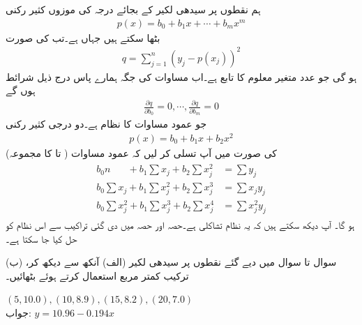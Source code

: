 ہم نقطوں پر سیدھی لکیر  کے بجائے درجہ  کی موزوں کثیر رکنی
\begin{align*}
p(x)=b_0+b_1x+\cdots+b_mx^m
\end{align*}
بٹھا سکتے ہیں جہاں  ہے۔تب  کی صورت 
\begin{align*}
q=\sum_{j=1}^{n}(y_j-p(x_j))^2
\end{align*}
ہو گی جو  عدد متغیر معلوم  کا تابع ہے۔اب مساوات  کی  جگہ ہمارے پاس درج ذیل  شرائط ہوں گے
\begin{align*}
\frac{\partial q}{\partial b_0}=0,\cdots,\frac{\partial q}{\partial b_m}=0
\end{align*}
جو   عمود مساوات کا نظام ہے۔دو درجی کثیر رکنی
\begin{align}\label{مساوات_خطی_اعدادی_کمتر_مربع_شرائط_ت}
p(x)=b_0+b_1x+b_2x^2
\end{align}
 کی صورت میں آپ تسلی کر لیں کہ عمود مساوات ( تا  کا مجموعہ)
\begin{gather}
\begin{aligned}\label{مساوات_خطی_اعدادی_کمتر_مربع_شرائط_ٹ}
b_0 n\phantom{\sum {}_j}+b_1\sum x_j+b_2\sum x_j^2&=\sum y_j\\[0.5ex]
b_0 \sum x_j +b_1\sum x_j^2 +b_2\sum x_j^3&=\sum x_jy_j\\[0.5ex]
b_0 \sum x_j^2+b_1\sum x_j^3+b_2\sum x_j^4&=\sum x_j^2y_j
\end{aligned}
\end{gather}
ہو گا۔ آپ دیکھ سکتے ہیں کہ یہ نظام تشاکلی ہے۔حصہ  اور حصہ  میں دی گئی تراکیب سے اس نظام کو حل کیا جا سکتا ہے۔


سوال  تا سوال  میں دیے گئے نقطوں پر سیدھی لکیر (الف) آنکھ سے دیکھ کر، (ب)  ترکیب کمتر مربع استعمال کرتے ہوئے  بٹھائیں۔ 

\quad
$(5,10.0), (10,8.9), (15,8.2), (20,7.0)$\\
جواب:\quad
$y=10.96-0.194x$

